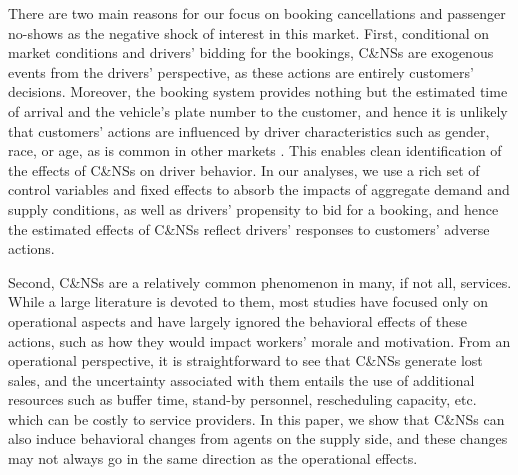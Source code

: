 \documentclass[reviewmode]{restud}
\begin{document}
There are two main reasons for our focus on booking cancellations and passenger no-shows as the negative shock of interest in this market.
First, conditional on market conditions and drivers' bidding for the bookings, C\&NSs are exogenous events from the drivers' perspective, as  
these actions are entirely 
customers' decisions. Moreover, the booking system provides nothing but 
the estimated time of arrival and the vehicle's plate number to the customer, and hence it is unlikely that customers' actions are influenced by driver characteristics such as gender, race, or age, as is common in other markets \citep{mejia2018transparency,cui2016discrimination,edelman2017racial,NBERw22776}. This enables clean identification of the effects of C\&NSs on driver behavior. In our analyses, we use a rich set of control variables and fixed effects to absorb the impacts of aggregate demand and supply conditions, as well as drivers' propensity to bid for a booking, and hence the estimated effects of C\&NSs reflect drivers' responses to customers' adverse actions.

Second,  C\&NSs are a relatively common phenomenon in many, if not all, services. While a large literature is devoted to them,  most studies \citep{moore2001time,liu2010dynamic,feldman2014appointment,zacharias2014appointment} have focused only on operational aspects and have largely ignored the behavioral effects of these actions, such as how they would impact workers' morale and motivation.
From an operational perspective, it is straightforward to see that C\&NSs generate lost sales, and the uncertainty associated with them entails the use of additional resources such as buffer time, stand-by personnel, rescheduling capacity, etc. which can be costly to service providers.
In this paper, we show that C\&NSs can also induce behavioral changes from agents on the supply side, and these changes may not always go in the same direction as the operational effects.
\end{document}

